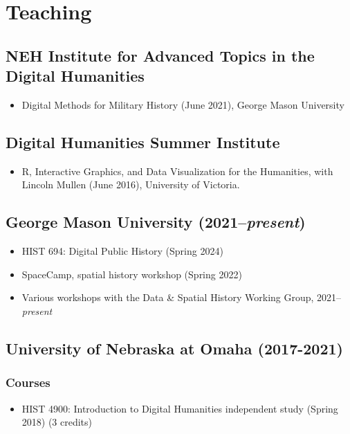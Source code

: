 \documentclass[10pt]{article}
\begin{document}
\section{Teaching}

\subsection*{NEH Institute for Advanced Topics in the Digital Humanities}

\begin{itemize}
  \item Digital Methods for Military History (June 2021), George Mason University
\end{itemize}

\subsection*{Digital Humanities Summer Institute}

\begin{itemize}
  \item R, Interactive Graphics, and Data Visualization for the Humanities, with Lincoln Mullen (June 2016), University of Victoria.
\end{itemize}

\subsection*{George Mason University (2021--\textit{present})}

\begin{itemize}
  \item HIST 694: Digital Public History (Spring 2024)
  \item SpaceCamp, spatial history workshop (Spring 2022)
  \item Various workshops with the Data \& Spatial History Working Group, 2021--\textit{present}
\end{itemize}

\subsection*{University of Nebraska at Omaha (2017-2021)}

\subsubsection*{Courses}

\begin{itemize}
  \item HIST 4900: Introduction to Digital Humanities independent study (Spring 2018) (3 credits)
\end{itemize}
\end{document}
